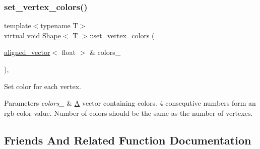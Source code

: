 \subsubsection{\texorpdfstring{set\+\_\+vertex\+\_\+colors()}{set\_vertex\_colors()}}
{\footnotesize\ttfamily template$<$typename T$>$ \\
virtual void \mbox{\hyperlink{classShape}{Shape}}$<$ T $>$\+::set\+\_\+vertex\+\_\+colors (\begin{DoxyParamCaption}\item[{\mbox{\hyperlink{type__definitions_8hpp_a087efd587d66b881646ef378f1919c90}{aligned\+\_\+vector}}$<$ float $>$ \&}]{colors\+\_\+ }\end{DoxyParamCaption})\hspace{0.3cm}{\ttfamily [inline]}, {\ttfamily [virtual]}}



Set color for each vertex. 


\begin{DoxyParams}{Parameters}
{\em colors\+\_\+} & \mbox{\hyperlink{classA}{A}} vector containing colors. 4 consequtive numbers form an rgb color value. Number of colors should be the same as the number of vertexes. \\
\hline
\end{DoxyParams}


\subsection{Friends And Related Function Documentation}
\mbox{\label{classShape_a0f7d9c8330ae4f062c6f569a7400e1f0}} 

